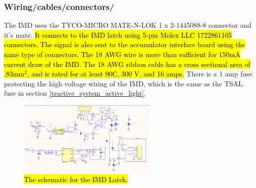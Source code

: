 \documentclass{article}
\DeclareRobustCommand{\hlr}[1]{{\sethlcolor{pink}\hl{#1}}}
\begin{document}
\subsubsection{Wiring/cables/connectors/}

The  IMD uses the TYCO-MICRO MATE-N-LOK 1 x 2-1445088-8 connector and it's mate. \hlr{It connects to the IMD latch using 5-pin Molex LLC 1722861105 connectors. The signal is also sent to the accumulator interface board using the same type of connectors. The 18 AWG wire is more than sufficient for 150mA current draw of the IMD. The 18 AWG ribbon cable has a cross sectional area of .83mm$^2$, and is rated for at least 90\textdegree C, 300 V, and 16 amps.} There is a 1 amp fuse protecting the high voltage wiring of the IMD, which is the same as the TSAL fuse in section \ref{tractive_system_active_light}. %




\begin{figure} [!ht]
	\centering  %
	
	\includegraphics[width=0.6\textwidth]{IMD_Latch_Rev2_AltiumSchematic.PNG}
	
	\caption{\hlr{The schematic for the IMD Latch.}}
	
	\label{fig:IMDLatch_Schematic}
\end{figure}
\end{document}
